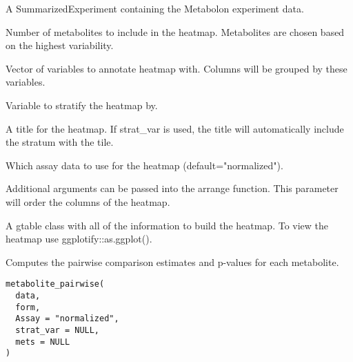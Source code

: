 \documentclass[a4paper]{book}
\begin{document}
%
\begin{Arguments}
\begin{ldescription}
\item[\code{data}] A SummarizedExperiment containing the Metabolon experiment data.

\item[\code{top\_mets}] Number of metabolites to include in the heatmap. Metabolites
are chosen based on the highest variability.

\item[\code{group\_vars}] Vector of variables to annotate heatmap with. Columns will
be grouped by these variables.

\item[\code{strat\_var}] Variable to stratify the heatmap by.

\item[\code{caption}] A title for the heatmap. If strat\_var is used, the title will
automatically include the stratum with the tile.

\item[\code{Assay}] Which assay data to use for the heatmap (default="normalized").

\item[\code{...}] Additional arguments can be passed into the arrange function.
This parameter will order the columns of the heatmap.
\end{ldescription}
\end{Arguments}
%
\begin{Value}
A gtable class with all of the information to build the heatmap. To view
the heatmap use ggplotify::as.ggplot().
\end{Value}
%
\begin{Description}
Computes the pairwise comparison estimates and p-values for each metabolite.
\end{Description}
%
\begin{Usage}
\begin{verbatim}
metabolite_pairwise(
  data,
  form,
  Assay = "normalized",
  strat_var = NULL,
  mets = NULL
)
\end{verbatim}
\end{Usage}
%
\end{document}
